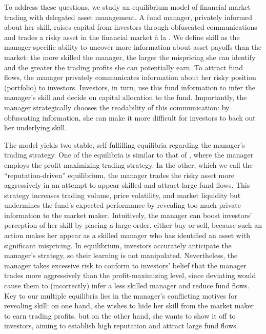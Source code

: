 To address these questions, we study an equilibrium model of financial market trading with delegated asset management. A fund manager, privately informed about her skill, raises capital from investors through obfuscated communications and trades a risky asset in the financial market \`a la \citet{kyle1985continuous}. We define skill as the manager-specific ability to uncover more information about asset payoffs than the market: the more skilled the manager, the larger the mispricing she can identify and the greater the trading profits she can potentially earn. To attract fund flows, the manager privately communicates information about her risky position (portfolio) to investors. Investors, in turn, use this fund information to infer the manager's skill and decide on capital allocation to the fund. Importantly, the manager strategically chooses the readability of this communication: by obfuscating information, she can make it more difficult for investors to back out her underlying skill.

The model yields two stable, self-fulfilling equilibria regarding the manager's trading strategy. One of the equilibria is similar to that of \citet{kyle1985continuous}, where the manager employs the profit-maximizing trading strategy. In the other, which we call the “reputation-driven” equilibrium, the manager trades the risky asset more aggressively in an attempt to appear skilled and attract large fund flows. This strategy increases trading volume, price volatility, and market liquidity but undermines the fund's expected performance by revealing too much private information to the market maker.
Intuitively, the manager can boost investors' perception of her skill by placing a large order, either buy or sell, because such an action makes her appear as a skilled manager who has identified an asset with significant mispricing. In equilibrium, investors accurately anticipate the manager's strategy, so their learning is not manipulated. Nevertheless, the manager takes excessive risk to conform to investors' belief that the manager trades more aggressively than the profit-maximizing level, since deviating would cause them to (incorrectly) infer a less skilled manager and reduce fund flows.
Key to our multiple equilibria lies in the manager's conflicting motives for revealing skill: on one hand, she wishes to hide her skill from the market maker to earn trading profits, but on the other hand, she wants to show it off to investors, aiming to establish high reputation and attract large fund flows. 

